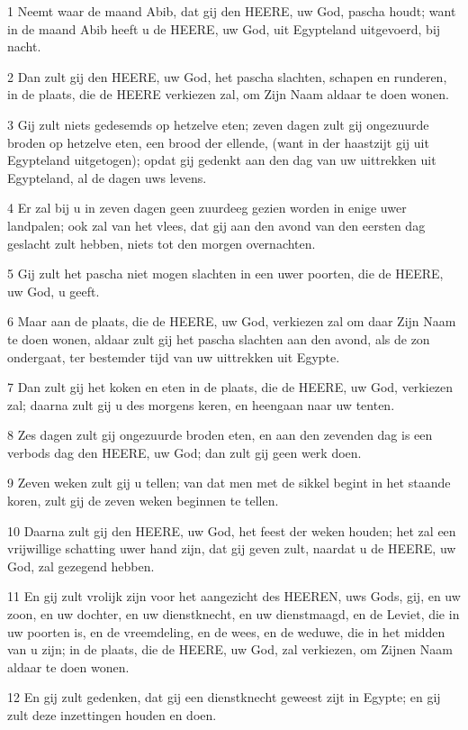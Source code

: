 \par 1 Neemt waar de maand Abib, dat gij den HEERE, uw God, pascha houdt; want in de maand Abib heeft u de HEERE, uw God, uit Egypteland uitgevoerd, bij nacht.
\par 2 Dan zult gij den HEERE, uw God, het pascha slachten, schapen en runderen, in de plaats, die de HEERE verkiezen zal, om Zijn Naam aldaar te doen wonen.
\par 3 Gij zult niets gedesemds op hetzelve eten; zeven dagen zult gij ongezuurde broden op hetzelve eten, een brood der ellende, (want in der haastzijt gij uit Egypteland uitgetogen); opdat gij gedenkt aan den dag van uw uittrekken uit Egypteland, al de dagen uws levens.
\par 4 Er zal bij u in zeven dagen geen zuurdeeg gezien worden in enige uwer landpalen; ook zal van het vlees, dat gij aan den avond van den eersten dag geslacht zult hebben, niets tot den morgen overnachten.
\par 5 Gij zult het pascha niet mogen slachten in een uwer poorten, die de HEERE, uw God, u geeft.
\par 6 Maar aan de plaats, die de HEERE, uw God, verkiezen zal om daar Zijn Naam te doen wonen, aldaar zult gij het pascha slachten aan den avond, als de zon ondergaat, ter bestemder tijd van uw uittrekken uit Egypte.
\par 7 Dan zult gij het koken en eten in de plaats, die de HEERE, uw God, verkiezen zal; daarna zult gij u des morgens keren, en heengaan naar uw tenten.
\par 8 Zes dagen zult gij ongezuurde broden eten, en aan den zevenden dag is een verbods dag den HEERE, uw God; dan zult gij geen werk doen.
\par 9 Zeven weken zult gij u tellen; van dat men met de sikkel begint in het staande koren, zult gij de zeven weken beginnen te tellen.
\par 10 Daarna zult gij den HEERE, uw God, het feest der weken houden; het zal een vrijwillige schatting uwer hand zijn, dat gij geven zult, naardat u de HEERE, uw God, zal gezegend hebben.
\par 11 En gij zult vrolijk zijn voor het aangezicht des HEEREN, uws Gods, gij, en uw zoon, en uw dochter, en uw dienstknecht, en uw dienstmaagd, en de Leviet, die in uw poorten is, en de vreemdeling, en de wees, en de weduwe, die in het midden van u zijn; in de plaats, die de HEERE, uw God, zal verkiezen, om Zijnen Naam aldaar te doen wonen.
\par 12 En gij zult gedenken, dat gij een dienstknecht geweest zijt in Egypte; en gij zult deze inzettingen houden en doen.
